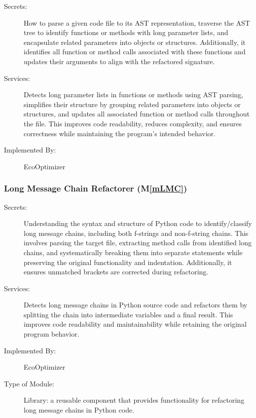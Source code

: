 \documentclass[12pt, titlepage]{article}
\newcommand{\mref}[1]{M\ref{#1}}
\begin{document}
\begin{description}
    \item[Secrets:] How to parse a given code file to its AST representation, traverse the AST tree to identify functions or methods with long parameter lists, and encapsulate related parameters into objects or structures. Additionally, it identifies all function or method calls associated with these functions and updates their arguments to align with the refactored signature.
    \item[Services:] Detects long parameter lists in functions or methods using AST parsing, simplifies their structure by grouping related parameters into objects or structures, and updates all associated function or method calls throughout the file. This improves code readability, reduces complexity, and ensures correctness while maintaining the program’s intended behavior.
    \item[Implemented By:] EcoOptimizer
\end{description}

\subsubsection{Long Message Chain Refactorer (\mref{mLMC})}


\begin{description}
    \item[Secrets:] Understanding the syntax and structure of Python code to identify/classify long message chains, including both f-strings and non-f-string chains. This involves parsing the target file, extracting method calls from identified long chains, and systematically breaking them into separate statements while preserving the original functionality and indentation. Additionally, it ensures unmatched brackets are corrected during refactoring.
    
    \item[Services:] Detects long message chains in Python source code and refactors them by splitting the chain into intermediate variables and a final result. This improves code readability and maintainability while retaining the original program behavior. 

    \item[Implemented By:] EcoOptimizer
    \item[Type of Module:] Library: a reusable component that provides functionality for refactoring long message chains in Python code.
   
\end{description}
\end{document}
